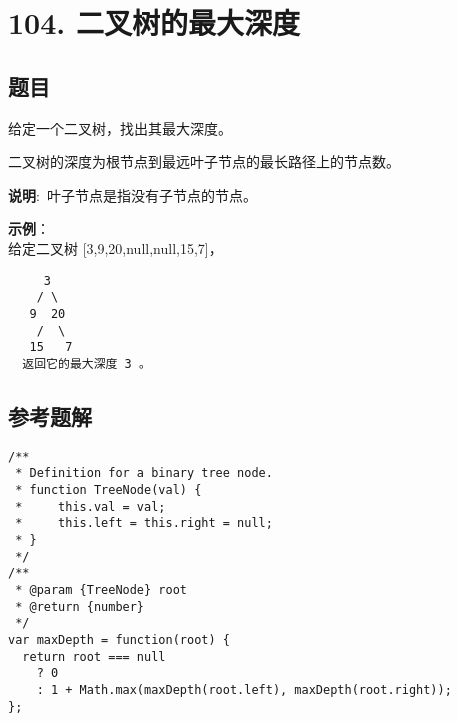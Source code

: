 \newpage
\section{104. 二叉树的最大深度}
\label{leetcode:104}

\subsection{题目}

给定一个二叉树，找出其最大深度。

二叉树的深度为根节点到最远叶子节点的最长路径上的节点数。

\textbf{说明}: 叶子节点是指没有子节点的节点。

\textbf{示例}：\\
给定二叉树 [3,9,20,null,null,15,7]，

\begin{verbatim}
     3
    / \
   9  20
    /  \
   15   7
  返回它的最大深度 3 。
\end{verbatim}

\subsection{参考题解}

\begin{verbatim}
/**
 * Definition for a binary tree node.
 * function TreeNode(val) {
 *     this.val = val;
 *     this.left = this.right = null;
 * }
 */
/**
 * @param {TreeNode} root
 * @return {number}
 */
var maxDepth = function(root) {
  return root === null
    ? 0
    : 1 + Math.max(maxDepth(root.left), maxDepth(root.right));
};
\end{verbatim}
